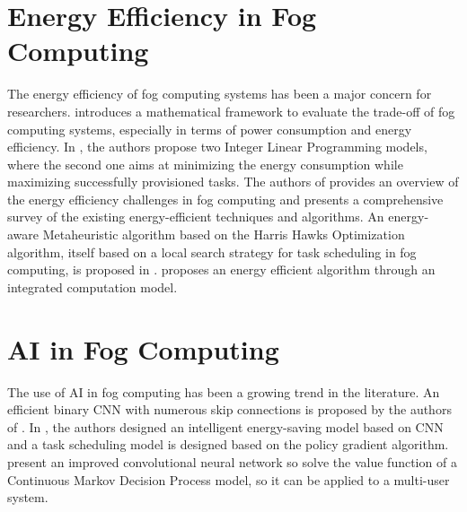 \section*{Energy Efficiency in Fog Computing}

The energy efficiency of fog computing systems has been a major concern for researchers. \cite{alhumaima-2020}
introduces a mathematical framework to evaluate the trade-off of fog computing systems, especially in terms of power
consumption and energy efficiency. In \cite{he-et-al-2020}, the authors propose two Integer Linear Programming models,
where the second one aims at minimizing the energy consumption while maximizing successfully provisioned tasks. The
authors of \cite{malik-et-al-2022} provides an overview of the energy efficiency challenges in fog computing and
presents a comprehensive survey of the existing energy-efficient techniques and algorithms. An energy-aware
Metaheuristic algorithm based on the Harris Hawks Optimization algorithm, itself based on a local search strategy for
task scheduling in fog computing, is proposed in \cite{abdel-basset-et-al-2021}. \cite{wang-et-al-2023} proposes an
energy efficient algorithm through an integrated computation model.

\section*{AI in Fog Computing}

The use of AI in fog computing has been a growing trend in the literature. An efficient binary CNN with numerous skip
connections is proposed by the authors of \cite{wu-et-al-2021}. In \cite{yang-et-al-2022}, the authors designed an
intelligent energy-saving model based on CNN and a task scheduling model is designed based on the policy gradient
algorithm. \cite{jing-xue-2023} present an improved convolutional neural network so solve the value function of a
Continuous Markov Decision Process model, so it can be applied to a multi-user system.
